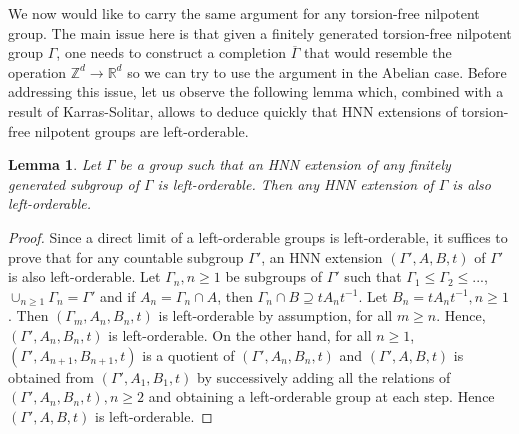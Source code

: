 \documentclass[12pt]{amsart}
\newtheorem{lem}[thm]{Lemma}
\theoremstyle{definition}
\begin{document}
   \medskip
   
   We now would like to carry the same argument for any torsion-free nilpotent group. The main issue here is that given a finitely generated torsion-free nilpotent group $\Gamma $, one needs to construct a completion $\overline{\Gamma }$ that would resemble the operation $\mathbb{Z}^d\to \mathbb{R}^d$ so we can try to use the argument in the Abelian case. Before addressing this issue, let us observe the following lemma which, combined with a result of Karras-Solitar, allows to deduce quickly that HNN extensions of torsion-free nilpotent groups are left-orderable.

    \begin{lem}\label{thm:indicable} Let $\Gamma $ be a group such that an HNN extension of any finitely generated subgroup of $\Gamma $ is left-orderable. Then any HNN extension of $\Gamma $ is also left-orderable.
    \end{lem}

      \begin{proof} Since a direct limit of a left-orderable groups is left-orderable, it suffices to prove that for any countable subgroup $\Gamma '$, an HNN extension $(\Gamma ', A, B, t)$ of $\Gamma '$ is also left-orderable. Let $\Gamma _n, n\geq 1$ be subgroups of $\Gamma '$ such that $\Gamma _1\leq \Gamma _2\leq ...$, $\displaystyle \mathop{\cup }_{n\geq 1}\Gamma _n = \Gamma '$ and if $A_n = \Gamma _n\cap A$, then $\Gamma _n\cap B \supseteq tA_nt^{-1}$. Let $B_n = tA_nt^{-1}, n\geq 1$. Then $(\Gamma _m, A_n, B_n,t)$ is left-orderable by assumption, for all $m\geq n$. Hence, $(\Gamma ', A_n, B_n,t)$ is left-orderable. On the other hand, for all $n\geq 1$, $(\Gamma ', A_{n+1}, B_{n+1},t)$ is a quotient of $(\Gamma ', A_n, B_n,t)$ and $(\Gamma ', A, B,t)$ is obtained from $(\Gamma ', A_1, B_1,t)$ by successively adding all the relations of $(\Gamma ', A_n, B_n,t), n\geq 2$ and obtaining a left-orderable group at each step. Hence $(\Gamma ', A, B,t)$ is left-orderable. 

      \end{proof} 
   
   \medskip
\end{document}

